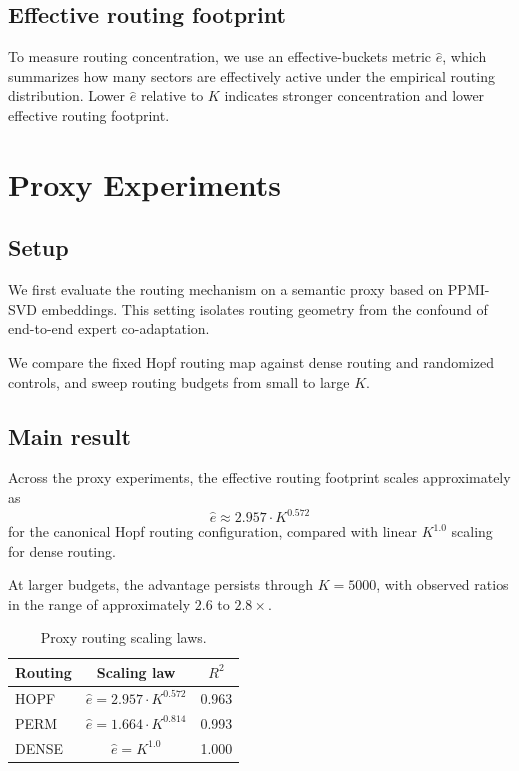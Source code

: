 \documentclass[10pt,twocolumn]{article}
\begin{document}
\subsection{Effective routing footprint}
To measure routing concentration, we use an effective-buckets metric $\hat e$, which summarizes how many sectors are effectively active under the empirical routing distribution. Lower $\hat e$ relative to $K$ indicates stronger concentration and lower effective routing footprint.

\section{Proxy Experiments}
\subsection{Setup}
We first evaluate the routing mechanism on a semantic proxy based on PPMI-SVD embeddings. This setting isolates routing geometry from the confound of end-to-end expert co-adaptation.

We compare the fixed Hopf routing map against dense routing and randomized controls, and sweep routing budgets from small to large $K$.

\subsection{Main result}
Across the proxy experiments, the effective routing footprint scales approximately as
\[
\hat e \approx 2.957 \cdot K^{0.572}
\]
for the canonical Hopf routing configuration, compared with linear $K^{1.0}$ scaling for dense routing.

At larger budgets, the advantage persists through $K=5000$, with observed ratios in the range of approximately $2.6$ to $2.8\times$.

\begin{table}[t]
\centering
\caption{Proxy routing scaling laws.}
\label{tab:scaling}
\small
\begin{tabular}{lcc}
\toprule
Routing & Scaling law & $R^2$ \\
\midrule
HOPF & $\hat e = 2.957 \cdot K^{0.572}$ & 0.963 \\
PERM & $\hat e = 1.664 \cdot K^{0.814}$ & 0.993 \\
DENSE & $\hat e = K^{1.0}$ & 1.000 \\
\bottomrule
\end{tabular}
\end{table}
\end{document}
